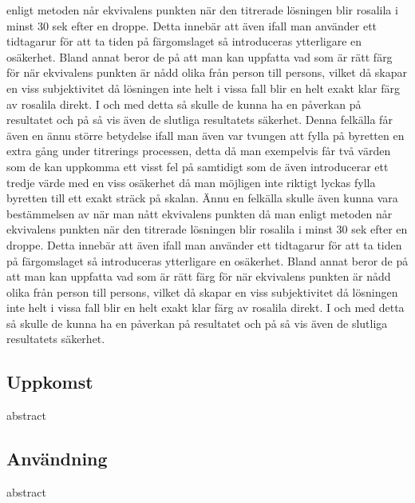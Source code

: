 enligt metoden når ekvivalens punkten när den titrerade lösningen blir rosalila i minst 30 sek efter en
droppe. Detta innebär att även ifall man använder ett tidtagarur för att ta tiden på färgomslaget så
introduceras ytterligare en osäkerhet. Bland annat beror de på att man kan uppfatta vad som är rätt
färg för när ekvivalens punkten är nådd olika från person till persons, vilket då skapar en viss
subjektivitet då lösningen inte helt i vissa fall blir en helt exakt klar färg av rosalila direkt. I och med
detta så skulle de kunna ha en påverkan på resultatet och på så vis även de slutliga
resultatets säkerhet. Denna felkälla får även en ännu större betydelse ifall man även var tvungen att fylla på
byretten en extra gång under titrerings processen, detta då man exempelvis får två värden som de kan
uppkomma ett visst fel på samtidigt som de även introducerar ett tredje värde med en viss osäkerhet
då man möjligen inte riktigt lyckas fylla byretten till ett exakt sträck på skalan.
Ännu en felkälla skulle även kunna vara bestämmelsen av när man nått ekvivalens punkten då man
enligt metoden når ekvivalens punkten när den titrerade lösningen blir rosalila i minst 30 sek efter en
droppe. Detta innebär att även ifall man använder ett tidtagarur för att ta tiden på färgomslaget så
introduceras ytterligare en osäkerhet. Bland annat beror de på att man kan uppfatta vad som är rätt
färg för när ekvivalens punkten är nådd olika från person till persons, vilket då skapar en viss
subjektivitet då lösningen inte helt i vissa fall blir en helt exakt klar färg av rosalila direkt. I och med
detta så skulle de kunna ha en påverkan på resultatet och på så vis även de slutliga
resultatets säkerhet.

\subsection{Uppkomst}
abstract

\subsection{Användning}
abstract